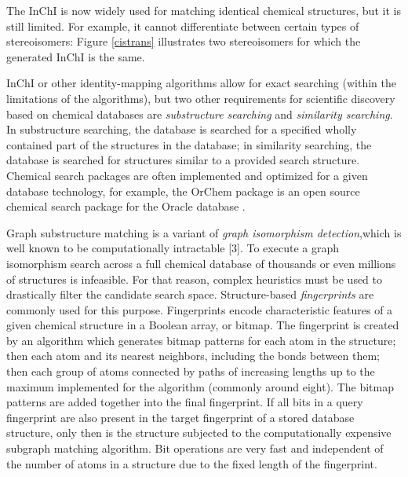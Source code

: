 \documentclass{sig-alternate}
\begin{document}

The InChI is now widely used for matching identical chemical structures, but it
is still limited. For example, it cannot differentiate between
certain types of stereoisomers: Figure \ref{cistrans} illustrates two stereoisomers for which
the generated InChI is the same.


InChI or other identity-mapping algorithms allow for exact searching (within the
limitations of the algorithms), but two other requirements for scientific
discovery based on chemical databases are \emph{substructure searching} and \emph{similarity
searching}. In substructure searching, the database is searched for a specified
wholly contained part of the structures in the database; in similarity
searching, the database is searched for structures similar to a provided search
structure. Chemical search packages are often implemented and optimized for a
given database technology, for example, the OrChem package is an open source
chemical search package for the Oracle database \cite{rijnbeek2009}.

Graph substructure matching is a variant of \emph{graph isomorphism detection},which is
well known to be computationally intractable [3]. To execute a graph isomorphism
search across a full chemical database of thousands or even millions of
structures is infeasible. For that reason, complex heuristics must be
used to drastically filter the candidate search space. Structure-based
\emph{fingerprints} are commonly used for this purpose. Fingerprints encode
characteristic features of a given chemical structure in a Boolean array, or
bitmap. The fingerprint is created by an algorithm which generates bitmap
patterns for each atom in the structure; then each atom and its nearest
neighbors, including the bonds between them; then each group of atoms connected
by paths of increasing lengths up to the maximum implemented for the algorithm
(commonly around eight). The bitmap patterns are added together into the final
fingerprint. If all bits in a query fingerprint are also present in the target
fingerprint of a stored database structure, only then is the structure subjected
to the computationally expensive subgraph matching algorithm. Bit operations are
very fast and independent of the number of atoms in a structure due to the fixed
length of the fingerprint.
\end{document}
